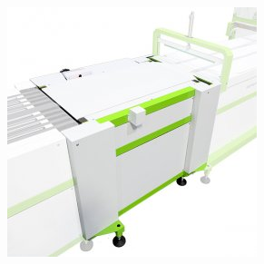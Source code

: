 \begin{frame}
\begin{figure}[ht]
\begin{center}
\includegraphics[scale=0.2]{./image/ROQ/maquinas/ROQ-LABEL1-275x275.jpg}
\end{center}
\end{figure}
\end{frame}
